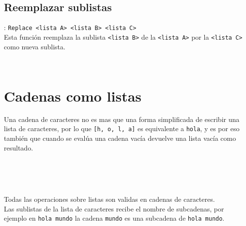       \subsection*{Reemplazar sublistas}: \texttt{Replace <lista A>~<lista B>~<lista C>}\\
      Esta función reemplaza la sublista \texttt{<lista B>} de la \texttt{<lista A>} por la \texttt{<lista C>} como nueva sublista.
      
      \begin{fxcode}
         \\
      \end{fxcode}
      
   \section{Cadenas como listas}
      Una cadena de caracteres no es mas que una forma simplificada de escribir una lista de caracteres, por lo que \texttt{[\textquotesingle h\textquotesingle, \textquotesingle o\textquotesingle, \textquotesingle l\textquotesingle, \textquotesingle a\textquotesingle]} es equivalente a \texttt{\textquotedbl hola\textquotedbl}, y es por eso también que cuando se evalúa una cadena vacía devuelve una lista vacía como resultado.
      
      \begin{fxcode}
         \arrowcode{\textquotedbl\textquotedbl}\\
         \outcode{[]}\\
         \\
      \end{fxcode}
      
      Todas las operaciones sobre listas son validas en cadenas de caracteres.
      \\
      
      Las sublistas de la lista de caracteres recibe el nombre de subcadenas, por ejemplo en \texttt{\textquotedbl hola mundo\textquotedbl} la cadena \texttt{\textquotedbl mundo\textquotedbl} es una subcadena de \texttt{\textquotedbl hola mundo\textquotedbl}.
      
   